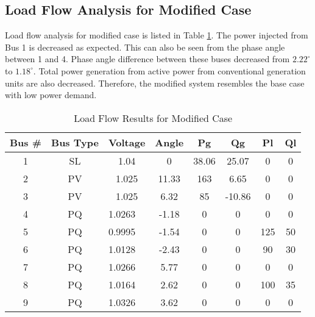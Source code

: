 \subsection{Load Flow Analysis for Modified Case}
Load flow analysis for modified case is listed in Table \ref{loadflow_case2}. The power injected from Bus 1 is decreased as expected. This can also be seen from the phase angle between 1 and 4. Phase angle difference between these buses decreased from $2.22^{\circ}$ to $1.18^{\circ}$. Total power generation from active power from conventional generation units are also decreased. Therefore, the modified system resembles the base case with low power demand.
\begin{table}[h!]
	\centering
	\begin{tabular}{cclccccc}
		\hline
		Bus \# & Bus Type & \multicolumn{1}{c}{Voltage} & Angle & Pg    & Qg     & Pl  & Ql \\ \hline
		1      & SL       & \multicolumn{1}{c}{1.04}    & 0     & 38.06 & 25.07  & 0   & 0  \\
		2      & PV       & \multicolumn{1}{c}{1.025}   & 11.33 & 163   & 6.65   & 0   & 0  \\
		3      & PV       & \multicolumn{1}{c}{1.025}   & 6.32  & 85    & -10.86 & 0   & 0  \\
		4      & PQ       & 1.0263                      & -1.18 & 0     & 0      & 0   & 0  \\
		5      & PQ       & 0.9995                      & -1.54 & 0     & 0      & 125 & 50 \\
		6      & PQ       & 1.0128                      & -2.43 & 0     & 0      & 90  & 30 \\
		7      & PQ       & 1.0266                      & 5.77  & 0     & 0      & 0   & 0  \\
		8      & PQ       & 1.0164                      & 2.62  & 0     & 0      & 100 & 35 \\
		9      & PQ       & 1.0326                      & 3.62  & 0     & 0      & 0   & 0  \\ \hline
	\end{tabular}
	\caption{Load Flow Results for Modified Case}
	\label{loadflow_case2}
\end{table}
